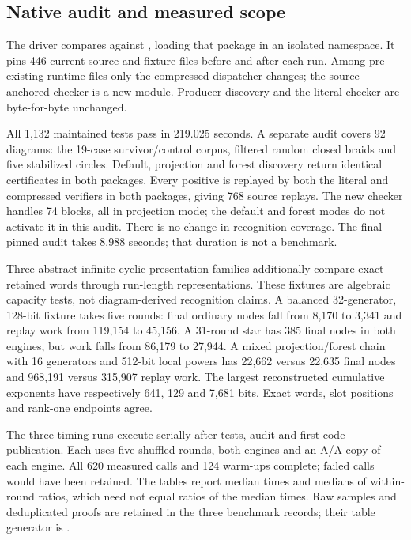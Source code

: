 \subsection{Native audit and measured scope}

The driver  compares
against , loading that package in an isolated namespace.
It pins 446 current source and fixture files before and after each run.
Among pre-existing runtime files only the compressed dispatcher changes;
the source-anchored checker is a new module. Producer discovery and the
literal checker are byte-for-byte unchanged.

All 1,132 maintained tests pass in 219.025 seconds. A separate audit covers
92 diagrams: the 19-case survivor/control corpus, filtered random closed
braids and five stabilized circles. Default, projection and forest discovery
return identical certificates in both packages. Every positive is replayed
by both the literal and compressed verifiers in both packages, giving 768
source replays. The new checker handles 74 blocks, all in projection mode;
the default and forest modes do not activate it in this audit. There is no
change in recognition coverage. The final pinned audit takes 8.988 seconds;
that duration is not a benchmark.

Three abstract infinite-cyclic presentation families additionally compare
exact retained words through run-length representations. These fixtures are
algebraic capacity tests, not diagram-derived recognition claims. A balanced
32-generator, 128-bit fixture takes five rounds: final ordinary nodes fall
from 8,170 to 3,341 and replay work from 119,154 to 45,156. A 31-round star
has 385 final nodes in both engines, but work falls from 86,179 to 27,944.
A mixed projection/forest chain with 16 generators and 512-bit local powers
has 22,662 versus 22,635 final nodes and 968,191 versus 315,907 replay work.
The largest reconstructed cumulative exponents have respectively 641, 129
and 7,681 bits. Exact words, slot positions and rank-one endpoints agree.

The three timing runs execute serially after tests, audit and first code
publication. Each uses five shuffled rounds, both engines and an A/A copy
of each engine. All 620 measured calls and 124 warm-ups complete; failed
calls would have been retained. The tables report median times and medians
of within-round ratios, which need not equal ratios of the median times.
Raw samples and deduplicated proofs are retained in the three
 benchmark records; their table generator
is .

